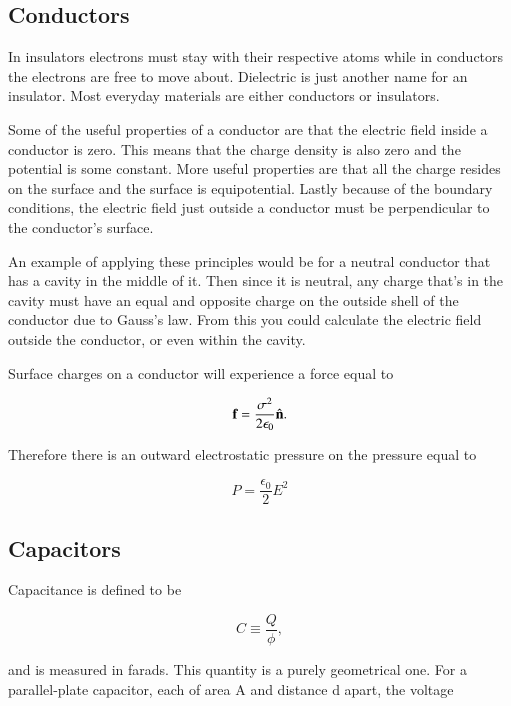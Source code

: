 \documentclass[preprint, review,12pt]{elsarticle}
\def\b{\textbf}
\def\={\equiv}
\newcommand{\hb}[1]{\hat{\b #1}}
\begin{document}
\subsection{Conductors}

In insulators electrons must stay with their respective atoms while in conductors the electrons are free to move about. Dielectric is just another name for an insulator. Most everyday materials are either conductors or insulators. 

Some of the useful properties of a conductor are that the electric field inside a conductor is zero. This means that the charge density is also zero and the potential is some constant. More useful properties are that all the charge resides on the surface and the surface is equipotential. Lastly because of the boundary conditions, the electric field just outside a conductor must be perpendicular to the conductor's surface. 

An example of applying these principles would be for a neutral conductor that has a cavity in the middle of it. Then since it is neutral, any charge that's in the cavity must have an equal and opposite charge on the outside shell of the conductor due to Gauss's law. From this you could calculate the electric field outside the conductor, or even within the cavity.

Surface charges on a conductor will experience a force equal to 

\begin{equation}
    \b{f} = \frac{\sigma^2}{2 \epsilon_0} \hb{n}.
\end{equation}

Therefore there is an outward electrostatic pressure on the pressure equal to

\begin{equation}
    P = \frac{\epsilon_0}{2}E^2
\end{equation}

\subsection{Capacitors}

Capacitance is defined to be

\begin{equation}
    C \= \frac{Q}{\phi},
\end{equation}

and is measured in farads. This quantity is a purely geometrical one. For a parallel-plate capacitor, each of area A and distance d apart, the voltage
\end{document}
